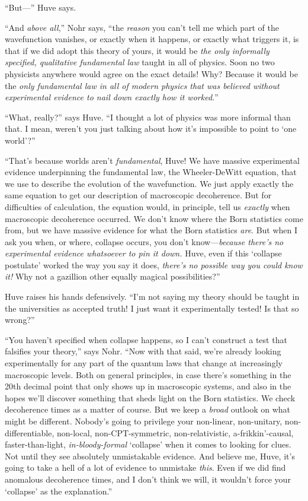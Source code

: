 {
 ``But---'' Huve says.}

{
 ``And \textit{above all},''
Nohr says, ``the \textit{reason} you
can't tell me which part of the wavefunction vanishes,
or exactly when it happens, or exactly what triggers it, is that if we
did adopt this theory of yours, it would be \textit{the only informally
specified, qualitative fundamental law} taught in all of physics. Soon
no two physicists anywhere would agree on the exact details! Why?
Because it would be the \textit{only fundamental law in all of modern
physics that was believed without experimental evidence to nail down
exactly how it worked.}''}

{
 ``What, really?'' says Huve.
``I thought a lot of physics was more informal than
that. I mean, weren't you just talking about how
it's impossible to point to `one
world'?''}

{
 ``That's because worlds
aren't \textit{fundamental}, Huve! We have massive
experimental evidence underpinning the fundamental law, the
Wheeler-DeWitt equation, that we use to describe the evolution of the
wavefunction. We just apply exactly the same equation to get our
description of macroscopic decoherence. But for difficulties of
calculation, the equation would, in principle, tell us \textit{exactly}
when macroscopic decoherence occurred. We don't know
where the Born statistics come from, but we have massive evidence for
what the Born statistics \textit{are}. But when I ask you when, or
where, collapse occurs, you don't
know---\textit{because there's no experimental evidence
whatsoever to pin it down.} Huve, even if this `collapse
postulate' worked the way you say it does,
\textit{there's no possible way you could know it!} Why
not a gazillion other equally magical
possibilities?''}

{
 Huve raises his hands defensively.
``I'm not saying my theory should be
taught in the universities as accepted truth! I just want it
experimentally tested! Is that so wrong?''}

{
 ``You haven't specified when
collapse happens, so I can't construct a test that
falsifies your theory,'' says Nohr.
``Now with that said, we're already
looking experimentally for any part of the quantum laws that change at
increasingly macroscopic levels. Both on general principles, in case
there's something in the 20th decimal point that only
shows up in macroscopic systems, and also in the hopes
we'll discover something that sheds light on the Born
statistics. We check decoherence times as a matter of course. But we
keep a \textit{broad} outlook on what might be different.
Nobody's going to privilege your non-linear,
non-unitary, non-differentiable, non-local, non-CPT-symmetric,
non-relativistic, a-frikkin'-causal, faster-than-light,
\textit{in-bloody-formal} `collapse'
when it comes to looking for clues. Not until they see absolutely
unmistakable evidence. And believe me, Huve, it's going
to take a hell of a lot of evidence to unmistake \textit{this}. Even if
we did find anomalous decoherence times, and I don't
think we will, it wouldn't force your
`collapse' as the
explanation.''}

